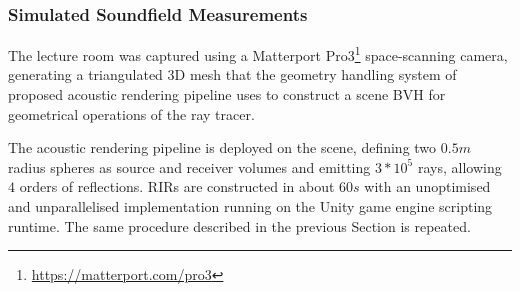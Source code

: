 \subsubsection{Simulated Soundfield Measurements}
The lecture room was captured using a Matterport Pro3\footnote{\url{https://matterport.com/pro3}} space-scanning camera, generating a triangulated 3D mesh that the geometry handling system of proposed acoustic rendering pipeline uses to construct a scene BVH for geometrical operations of the ray tracer.\par
The acoustic rendering pipeline is deployed on the scene, defining two $0.5m$ radius spheres as source and receiver volumes and emitting $3*10^5$ rays, allowing $4$ orders of reflections. RIRs are constructed in about $60s$ with an unoptimised and unparallelised implementation running on the Unity game engine scripting runtime. The same procedure described in the previous Section is repeated. \par

